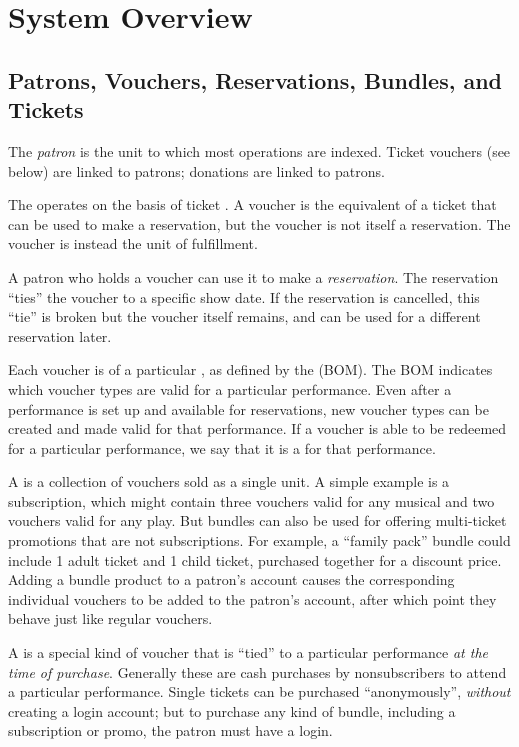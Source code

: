 \section{System Overview}

\subsection{Patrons, Vouchers,  Reservations, Bundles, and Tickets}
\label{sec:overview-vouchers}

The \emph{patron} is the unit to which most operations are indexed.
Ticket vouchers (see below) are linked to
patrons; donations are linked to patrons.

The \af operates on the basis of ticket . A
voucher is the equivalent of a ticket that can be used to make a
reservation, but the voucher is not itself a reservation. The voucher is
instead the unit of fulfillment.  

A patron who holds a voucher can use it to make a \emph{reservation}.
The reservation ``ties'' the voucher to a specific show date.
If the reservation is cancelled, this ``tie'' is broken but the voucher
itself remains, and can be used for a different reservation later.

Each voucher is of a particular , as defined by the  (BOM).  The BOM indicates
which voucher types are valid for a particular performance.  Even after
a performance is set up and available for reservations, new voucher
types can be created and made valid for that performance.  If a voucher
is able to be redeemed for a particular performance, we say that it is a
 for that performance.

A  is a collection of vouchers sold as a single unit.
A simple example is a subscription, which might contain three vouchers
valid for any musical and two vouchers valid for any play.  But bundles
can also be used for offering multi-ticket promotions that are not
subscriptions.  For example,  a ``family pack''
bundle could include 1 adult ticket and 1 child ticket, purchased
together for a discount price.  Adding a bundle product to a patron's
account causes the corresponding individual vouchers to be
added to the patron's account, after which point they behave just like
regular vouchers.  

A  is a special kind of voucher that is ``tied'' to a
particular performance \emph{at the time of purchase}.  Generally these
are cash purchases  by nonsubscribers to attend a  particular
performance.  Single tickets can be purchased ``anonymously'', \emph{without} 
creating a login account; but to purchase any kind of bundle, including
a subscription or promo, the patron must have a login.

